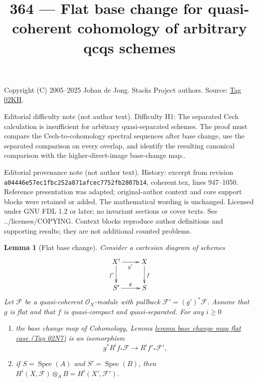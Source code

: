 \documentclass{amsart}
\theoremstyle{plain}
\newtheorem{lemma}[subsection]{Lemma}
\theoremstyle{definition}
\theoremstyle{remark}
\numberwithin{equation}{subsection}
\def\Spec{\mathop{\mathrm{Spec}}}
\begin{document}
\title[Stacks Project, Tag 02KH]{364 --- Flat base change for quasi-coherent cohomology of arbitrary qcqs schemes}
\maketitle
\noindent Copyright (C) 2005--2025 Johan de Jong. Stacks Project authors. Source: \href{https://stacks.math.columbia.edu/tag/02KH}{Tag 02KH}.

\noindent Editorial difficulty note (not author text). Difficulty H1: The separated Cech calculation is insufficient for arbitrary quasi-separated schemes. The proof must compare the Cech-to-cohomology spectral sequences after base change, use the separated comparison on every overlap, and identify the resulting canonical comparison with the higher-direct-image base-change map..

\noindent Editorial provenance note (not author text). History: excerpt from revision \texttt{a0444\allowbreak 6e57e\allowbreak c1fbc\allowbreak 252a8\allowbreak 71afc\allowbreak ec775\allowbreak 2fb28\allowbreak 07b14}, coherent.tex, lines 947--1050. Reference presentation was adapted; original-author context and core support blocks were retained or added. The mathematical wording is unchanged. Licensed under GNU FDL 1.2 or later; no invariant sections or cover texts. See ../licenses/COPYING. Context blocks reproduce author definitions and supporting results; they are not additional counted problems.

\begin{lemma}[Flat base change]
\label{lemma-flat-base-change-cohomology}
Consider a cartesian diagram of schemes
$$
\xymatrix{
X' \ar[d]_{f'} \ar[r]_{g'} & X \ar[d]^f \\
S' \ar[r]^g & S
}
$$
Let $\mathcal{F}$ be a quasi-coherent $\mathcal{O}_X$-module
with pullback $\mathcal{F}' = (g')^*\mathcal{F}$.
Assume that $g$ is flat and that $f$ is quasi-compact and quasi-separated.
For any $i \geq 0$
\begin{enumerate}
\item the base change map of
Cohomology, Lemma \href{https://stacks.math.columbia.edu/tag/02N7}{lemma base change map flat case (Tag 02N7)}
is an isomorphism
$$
g^*R^if_*\mathcal{F} \longrightarrow R^if'_*\mathcal{F}',
$$
\item if $S = \Spec(A)$ and $S' = \Spec(B)$, then
$H^i(X, \mathcal{F}) \otimes_A B = H^i(X', \mathcal{F}')$.
\end{enumerate}
\end{lemma}
\end{document}
